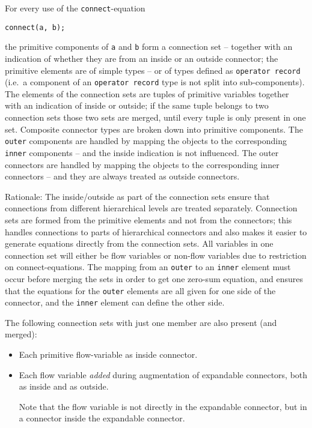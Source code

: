 For every use of the \lstinline!connect!-equation
\begin{lstlisting}[language=modelica]
connect(a, b);
\end{lstlisting}

the primitive components of \lstinline!a! and \lstinline!b! form a connection set -- together
with an indication of whether they are from an inside or an outside
connector; the primitive elements are of simple types -- or of types
defined as \lstinline!operator record! (i.e.\ a component of an \lstinline!operator record! type
is not split into sub-components). The elements of the connection sets
are tuples of primitive variables together with an indication of inside
or outside; if the same tuple belongs to two connection sets those two
sets are merged, until every tuple is only present in one set. Composite
connector types are broken down into primitive components. The \lstinline!outer!
components are handled by mapping the objects to the corresponding \lstinline!inner!
components -- and the inside indication is not influenced. The outer
connectors are handled by mapping the objects to the corresponding inner
connectors -- and they are always treated as outside connectors.

\begin{nonnormative}
Rationale: The inside/outside as part of the connection sets
ensure that connections from different hierarchical levels are treated
separately. Connection sets are formed from the primitive elements and
not from the connectors; this handles connections to parts of
hierarchical connectors and also makes it easier to generate equations
directly from the connection sets. All variables in one connection set
will either be flow variables or non-flow variables due to restriction
on connect-equations. The mapping from an \lstinline!outer! to an \lstinline!inner!
element must occur before merging the sets in order to get one
zero-sum equation, and ensures that the equations for the \lstinline!outer!
elements are all given for one side of the connector, and the
\lstinline!inner! element can define the other side.
\end{nonnormative}

The following connection sets with just one member are also present (and
merged):
\begin{itemize}
\item
  Each primitive flow-variable as inside connector.
\item
  Each flow variable \emph{added} during augmentation of expandable
  connectors, both as inside and as outside.
  \begin{nonnormative}
  Note that the flow variable is not directly in the expandable connector, but in a connector inside the expandable connector.
  \end{nonnormative}
\end{itemize}

